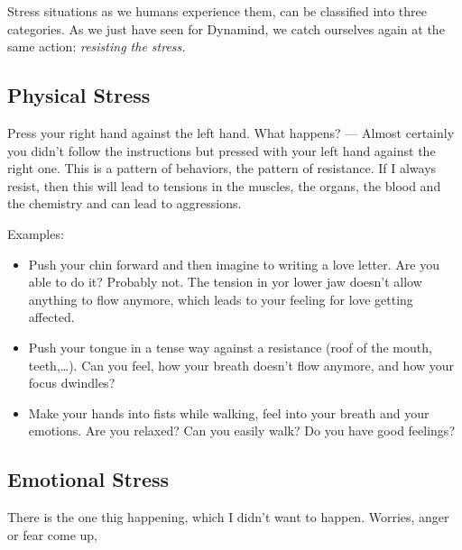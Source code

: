 \documentclass[../main.tex]{subfiles}
\begin{document}
Stress situations as we humans experience them, can be classified into three categories.
As we just have seen for Dynamind, we catch ourselves again at the same action: \emph{resisting the stress.}

\subsection{Physical Stress}
Press your right hand against the left hand. What happens? ---
Almost certainly you didn't follow the instructions but pressed with your left hand against the right one.
This is a pattern of behaviors, the pattern of resistance.
If I always resist, then this will lead to tensions in the muscles, the organs, the blood and the chemistry and can lead to aggressions.

Examples:
\begin{itemize}
\item Push your chin forward and then imagine to writing a love letter. Are you able to do it? Probably not.
  The tension in yor lower jaw doesn't allow anything to flow anymore, which leads to your feeling for love getting affected.
\item Push your tongue in a tense way against a resistance (roof of the mouth, teeth,\ldots).
    Can you feel, how your breath doesn't flow anymore, and how your focus dwindles?
  \item Make your hands into fists while walking, feel into your breath and your emotions. Are you relaxed?
    Can you easily walk? Do you have good feelings?
  \end{itemize}

  \subsection{Emotional  Stress}

  There is the one thig happening, which I didn't want to happen.
  Worries, anger or fear come up,
  
\end{document}
